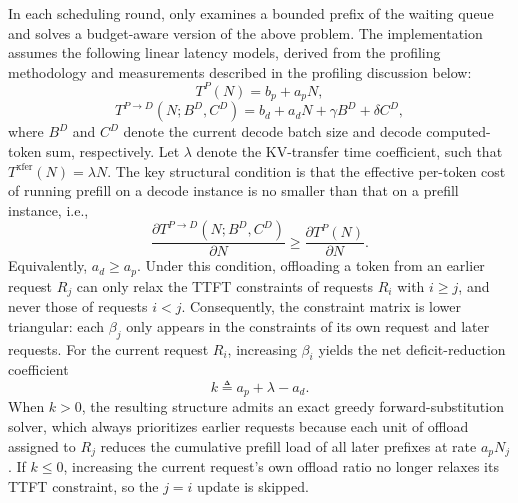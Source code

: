 In each scheduling round, \instance only examines a bounded prefix of the waiting queue and solves a budget-aware version of the above problem.
The implementation assumes the following linear latency models, derived from the profiling methodology and measurements described in the profiling discussion below:
\begin{equation}
    T^P(N) = b_p + a_pN,
\end{equation}
\begin{equation}
    T^{P\to D}(N; B^D, C^D) = b_d + a_dN + \gamma B^D + \delta C^D,
\end{equation}
where $B^D$ and $C^D$ denote the current decode batch size and decode computed-token sum, respectively.
Let $\lambda$ denote the KV-transfer time coefficient, such that $T^{\mathrm{xfer}}(N)=\lambda N$.
The key structural condition is that the effective per-token cost of running prefill on a decode instance is no smaller than that on a prefill instance, i.e.,
\begin{equation}
    \frac{\partial T^{P\to D}(N; B^D, C^D)}{\partial N}
    \ge
    \frac{\partial T^P(N)}{\partial N}.
\end{equation}
Equivalently, $a_d \ge a_p$.
Under this condition, offloading a token from an earlier request $R_j$ can only relax the TTFT constraints of requests $R_i$ with $i\ge j$, and never those of requests $i<j$.
Consequently, the constraint matrix is lower triangular: each $\beta_j$ only appears in the constraints of its own request and later requests.
For the current request $R_i$, increasing $\beta_i$ yields the net deficit-reduction coefficient
\begin{equation}
    k \triangleq a_p + \lambda - a_d.
\end{equation}
When $k>0$, the resulting structure admits an exact greedy forward-substitution solver, which always prioritizes earlier requests because each unit of offload assigned to $R_j$ reduces the cumulative prefill load of all later prefixes at rate $a_pN_j$.
If $k\le 0$, increasing the current request's own offload ratio no longer relaxes its TTFT constraint, so the $j=i$ update is skipped.

